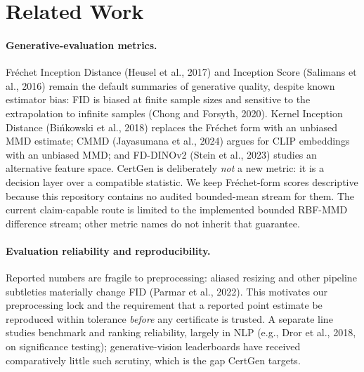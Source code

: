 \section{Related Work}


\paragraph{Generative-evaluation metrics.}
Fr\'echet Inception Distance (Heusel et al., 2017) and Inception Score (Salimans
et al., 2016) remain the default summaries of generative quality, despite known
estimator bias: FID is biased at finite sample sizes and sensitive to the
extrapolation to infinite samples (Chong and Forsyth, 2020). Kernel Inception
Distance (Bi\'nkowski et al., 2018) replaces the Fr\'echet form with an unbiased
MMD estimate; CMMD (Jayasumana et al., 2024) argues for CLIP embeddings with an
unbiased MMD; and FD-DINOv2 (Stein et al., 2023) studies an alternative feature
space. CertGen is deliberately \emph{not} a new metric: it is a decision layer
over a compatible statistic. We keep Fr\'echet-form scores descriptive because
this repository contains no audited bounded-mean stream for them. The current
claim-capable route is limited to the implemented bounded RBF-MMD difference
stream; other metric names do not inherit that guarantee.

\paragraph{Evaluation reliability and reproducibility.}
Reported numbers are fragile to preprocessing: aliased resizing and other
pipeline subtleties materially change FID (Parmar et al., 2022). This motivates
our preprocessing lock and the requirement that a reported point estimate be
reproduced within tolerance \emph{before} any certificate is trusted. A separate
line studies benchmark and ranking reliability, largely in NLP (e.g., Dror et
al., 2018, on significance testing); generative-vision leaderboards have received
comparatively little such scrutiny, which is the gap CertGen targets.

